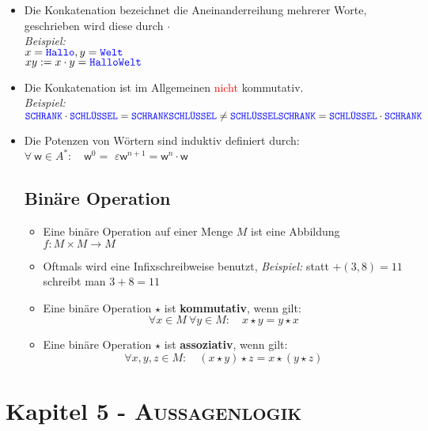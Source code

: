 \documentclass{article}
\newcommand{\leer}{$\varepsilon$}
\newcommand{\kapitel}[2]{Kapitel #1 - \textsc{#2}}
\newcommand{\blue}[1]{\textcolor{blue}{#1}}
\newcommand{\red}[1]{\textcolor{red}{#1}}
\newcommand{\strongColor}[1]{\textcolor{strongColor}{#1}}
\newcommand{\strong}[1]{\textbf{\strongColor{#1}}}
\newcommand{\important}[1]{\textcolor{importantColor}{#1}}
\newcommand{\example}[1]{\textit{Beispiel: }#1}
\newcommand{\word}[1]{\blue{\texttt{#1}}}
\newcommand{\w}{\textsf{w}}
\begin{document}
\begin{itemize}
    \item Die Konkatenation bezeichnet die Aneinanderreihung mehrerer Worte, geschrieben wird diese durch \strong{$\cdot$}\\
    \example\\ $x = \word{Hallo}, y = \word{Welt}$\\
    $xy:=x\cdot y = \word{HalloWelt}$
    \item Die Konkatenation ist im Allgemeinen \red{nicht} kommutativ.\\ \example\\ $\word{SCHRANK} \cdot \word{SCHLÜSSEL} = \word{SCHRANKSCHLÜSSEL} \neq \word{SCHLÜSSELSCHRANK} = \word{SCHLÜSSEL} \cdot \word{SCHRANK}$
    \item Die Potenzen von Wörtern sind induktiv definiert durch:\\
    $\forall \:\w \in A^*:\quad$$\w^0=$ \leer\qquad$\w^{n+1}=\w^n\cdot \w$
    
    \subsection{Binäre Operation}
    \begin{itemize}
        \item Eine \important{binäre Operation} auf einer Menge $M$ ist eine Abbildung $f: M\times M \to M$
        \item Oftmals wird eine Infixschreibweise benutzt, \example statt $+(3,8)=11$ schreibt man $3+8=11$
        \item Eine binäre Operation $\star$ ist \strong{kommutativ}, wenn gilt:
        \[ \forall x \in M \:\forall y \in M: \quad x\star y = y \star x \]
        \item Eine binäre Operation $\star$ ist \strong{assoziativ}, wenn gilt:
        \[ \forall x,y,z \in M: \quad (x\star y)\star z = x \star (y \star z) \]
    \end{itemize}
\end{itemize}

\newpage

\section{\kapitel{5}{Aussagenlogik}}
\end{document}
